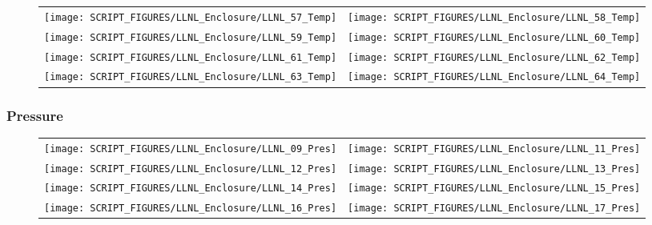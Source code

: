 \begin{figure}[!ht]
\begin{tabular*}{\textwidth}{l@{\extracolsep{\fill}}r}
\texttt{[image: SCRIPT\_FIGURES/LLNL\_Enclosure/LLNL\_57\_Temp]} &
\texttt{[image: SCRIPT\_FIGURES/LLNL\_Enclosure/LLNL\_58\_Temp]} \\
\texttt{[image: SCRIPT\_FIGURES/LLNL\_Enclosure/LLNL\_59\_Temp]} &
\texttt{[image: SCRIPT\_FIGURES/LLNL\_Enclosure/LLNL\_60\_Temp]} \\
\texttt{[image: SCRIPT\_FIGURES/LLNL\_Enclosure/LLNL\_61\_Temp]} &
\texttt{[image: SCRIPT\_FIGURES/LLNL\_Enclosure/LLNL\_62\_Temp]} \\
\texttt{[image: SCRIPT\_FIGURES/LLNL\_Enclosure/LLNL\_63\_Temp]} &
\texttt{[image: SCRIPT\_FIGURES/LLNL\_Enclosure/LLNL\_64\_Temp]}
\end{tabular*}
\label{LLNL_Enclosure_Temp_8}
\end{figure}

\clearpage

\subsubsection{Pressure}

\begin{figure}[!ht]
\begin{tabular*}{\textwidth}{l@{\extracolsep{\fill}}r}
\texttt{[image: SCRIPT\_FIGURES/LLNL\_Enclosure/LLNL\_09\_Pres]} &
\texttt{[image: SCRIPT\_FIGURES/LLNL\_Enclosure/LLNL\_11\_Pres]} \\
\texttt{[image: SCRIPT\_FIGURES/LLNL\_Enclosure/LLNL\_12\_Pres]} &
\texttt{[image: SCRIPT\_FIGURES/LLNL\_Enclosure/LLNL\_13\_Pres]} \\
\texttt{[image: SCRIPT\_FIGURES/LLNL\_Enclosure/LLNL\_14\_Pres]} &
\texttt{[image: SCRIPT\_FIGURES/LLNL\_Enclosure/LLNL\_15\_Pres]} \\
\texttt{[image: SCRIPT\_FIGURES/LLNL\_Enclosure/LLNL\_16\_Pres]} &
\texttt{[image: SCRIPT\_FIGURES/LLNL\_Enclosure/LLNL\_17\_Pres]}
\end{tabular*}
\label{LLNL_Enclosure_Pres_2}
\end{figure}

